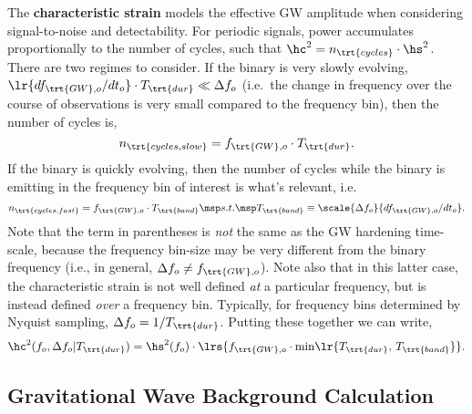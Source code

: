 \documentclass[10pt, oneside, onecolumn]{article}   	%
\newcommand{\fobsgw}{f_{\trt{GW},o}}
\newcommand{\tdur}{T_\trt{dur}}
\begin{document}
                The \textbf{characteristic strain} models the effective GW amplitude when considering signal-to-noise and detectability.  For periodic signals, power accumulates proportionally to the number of cycles, such that $\hc^2 = n_\trt{cycles} \cdot \hs^2$.  There are two regimes to consider.  If the binary is very slowly evolving, $\lr{d\fobsgw/dt_o} \cdot \tdur \ll \Delta f_o$ (i.e.~the change in frequency over the course of observations is very small compared to the frequency bin), then the number of cycles is,
                \begin{equation}
                    n_\trt{cycles,slow} = \fobsgw \cdot \tdur.
                \end{equation}
                If the binary is quickly evolving, then the number of cycles while the binary is emitting in the frequency bin of interest is what's relevant, i.e.
                \begin{equation}
                    n_\trt{cycles,fast} = \fobsgw \cdot T_\trt{band} \msp s.t. \msp T_\trt{band} \equiv \scale{\Delta f_o }{ d\fobsgw / dt_o }.
                \end{equation}
                Note that the term in parentheses is \textit{not} the same as the GW hardening time-scale, because the frequency bin-size may be very different from the binary frequency (i.e., in general, $\Delta f_o \neq \fobsgw$).  Note also that in this latter case, the characteristic strain is not well defined \textit{at} a particular frequency, but is instead defined \textit{over} a frequency bin.  Typically, for frequency bins determined by Nyquist sampling, $\Delta f_o = 1 / \tdur$.  Putting these together we can write,
                \begin{equation}
                    \hc^2(f_o,\Delta f_o|\tdur) = \hs^2(f_o) \cdot \lrs{\fobsgw \cdot \min\!\lr{\tdur, \, T_\trt{band}}}.
                \end{equation}




        \subsection{Gravitational Wave Background Calculation}
            \label{sec:gw_gwb_calc}
\end{document}
